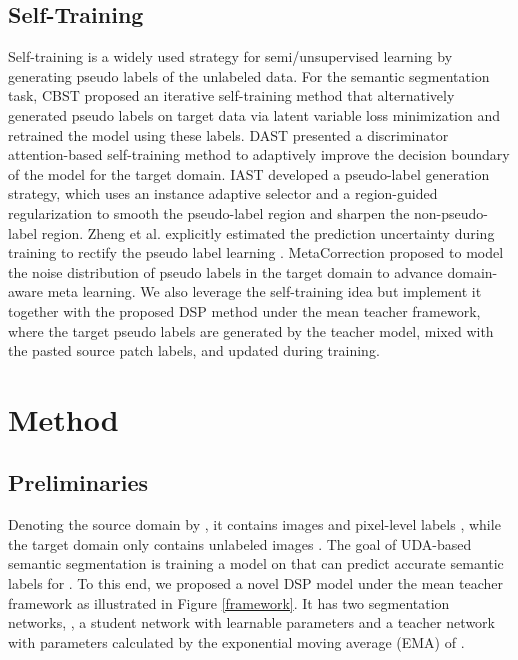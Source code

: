 \documentclass[sigconf]{acmart}
\begin{document}
\subsection{Self-Training}
Self-training is a widely used strategy for semi/unsupervised learning by generating pseudo labels of the unlabeled data. For the semantic segmentation task, CBST \cite{cbst} proposed an iterative self-training method that alternatively generated pseudo labels on target data via latent variable loss minimization and retrained the model using these labels. DAST \cite{DAST} presented a discriminator attention-based self-training method to adaptively improve the decision boundary of the model for the target domain. IAST \cite{IAST} developed a pseudo-label generation strategy, which uses an instance adaptive selector and a region-guided regularization to smooth the pseudo-label region and sharpen the non-pseudo-label region. Zheng et al. explicitly estimated the prediction uncertainty during training to rectify the pseudo label learning \cite{rpll}. MetaCorrection \cite{MetaCorrection} proposed to model the noise distribution of pseudo labels in the target domain to advance domain-aware meta learning. We also leverage the self-training idea but implement it together with the proposed DSP method under the mean teacher framework, where the target pseudo labels are generated by the teacher model, mixed with the pasted source patch labels, and updated during training. 

\section{Method}
\subsection{Preliminaries}
Denoting the source domain by , it contains images  and pixel-level labels , while the target domain  only contains unlabeled images . The goal of UDA-based semantic segmentation is training a model on  that can predict accurate semantic labels for . To this end, we proposed a novel DSP model under the mean teacher framework as illustrated in Figure \ref{framework}. It has two segmentation networks, , a student network  with learnable parameters  and a teacher network  with parameters  calculated by the exponential moving average (EMA) of .
\end{document}
